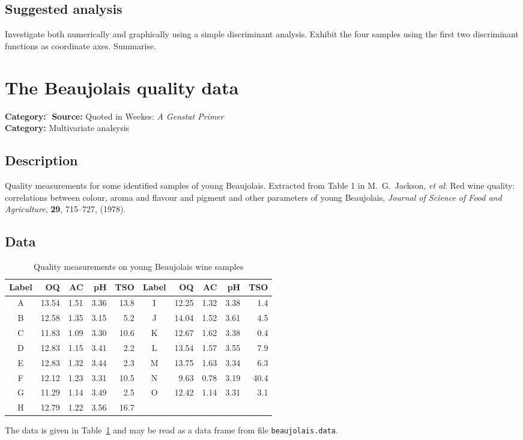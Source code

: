 \documentclass{article}
\newcommand{\strutt}{\vrule height 2.5ex depth 0.5ex width 0ex}%
\newcommand{\code}[1]{\texttt{#1}}
\begin{document}
\subsection*{Suggested analysis}
Investigate both numerically and graphically using a simple discriminant
analysis.  Exhibit the four samples using the first two discriminant
functions as coordinate axes.  Summarise.


\clearpage\section{The Beaujolais quality data}
\begin{tabbing}
\textbf{Category:} \= \kill
\textbf{Source:} \> Quoted in Weekes: \emph{A Genstat Primer}\\
\textbf{Category:} \> Multivariate analsysis
\end{tabbing}

\subsection*{Description}
Quality measurements for some identified samples of young Beaujolais.
Extracted from Table 1 in M.~G.~Jackson, \emph{et al}: Red wine quality:
correlations between colour, aroma and flavour and pigment and other
parameters of young Beaujolais, \emph{Journal of Science of Food and
Agriculture}, \textbf{29}, 715--727, (1978).

\subsection*{Data}

\begin{table}[ht]
\begin{center}
\begin{tabular}{@{\protect\strutt}|*{2}{c|rrrr|}}
\hline
Label & OQ & AC & pH & TSO & Label & OQ & AC & pH & TSO \\
\hline
 A & 13.54 & 1.51 & 3.36 & 13.8 & I &  12.25 & 1.32 & 3.38 & 1.4 \\
 B & 12.58 & 1.35 & 3.15 & 5.2  & J &  14.04 & 1.52 & 3.61 & 4.5 \\
 C & 11.83 & 1.09 & 3.30 & 10.6 & K &  12.67 & 1.62 & 3.38 & 0.4 \\
 D & 12.83 & 1.15 & 3.41 & 2.2  & L &  13.54 & 1.57 & 3.55 & 7.9 \\
 E & 12.83 & 1.32 & 3.44 & 2.3  & M &  13.75 & 1.63 & 3.34 & 6.3 \\
 F & 12.12 & 1.23 & 3.31 & 10.5 & N &  9.63 & 0.78 & 3.19 &40.4 \\
 G & 11.29 & 1.14 & 3.49 & 2.5  & O &  12.42 & 1.14 & 3.31 & 3.1 \\
 H & 12.79 & 1.22 & 3.56 & 16.7 &   &   & & & \\
\hline
\end{tabular}
\end{center}
\caption{\label{wine} Quality measurements on young Beaujolais wine samples}
\end{table}
The data is given in Table~\ref{wine} and may be read as a data frame from
file \code{beaujolais.data}.
\end{document}
